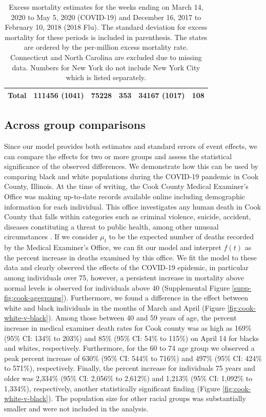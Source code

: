 \documentclass[11pt]{article}
\begin{document}
\begin{table}
\begin{tabular}{|l|lll|ll|}
 \hline
  Total & 111456 (1041) & 75228 & 353 & 34167 (1017) & 108 \\ 
  \hline
 \end{tabular}
 \caption{Excess mortality estimates for the weeks ending on March 14, 2020 to May 5, 2020 (COVID-19) and  December 16, 2017 to February 10, 2018 (2018 Flu). The standard deviation for excess mortality for these periods is included in parenthesis. The states are ordered by the per-million excess mortality rate. Connecticut and North Carolina are excluded due to missing data. Numbers for New York do not include New York City which is listed separately.}
 \label{tab:covid19-states}
 \normalsize
\end{table}
 
 

\subsection{Across group comparisons}
\label{subsec:group-comparison}
Since our model provides both estimates and standard errors of event effects, we can compare the effects for two or more groups and assess the statistical significance of the observed differences. We demonstrate how this can be used by comparing black and white populations during the COVID-19 pandemic in Cook County, Illinois. At the time of writing, the Cook County Medical Examiner's Office was making up-to-date records available online including demographic information for each individual. This office investigates any human death in Cook County that falls within categories such as criminal violence, suicide, accident, diseases constituting a threat to public health, among other unusual circumstances \cite{cookcovid19}. If we consider $\mu_t$ to be the expected number of deaths recorded by the Medical Examiner's Office, we can fit our model and interpret $f(t)$ as the percent increase in deaths examined by this office. We fit the model to these data and clearly observed the effects of the COVID-19 epidemic, in particular among individuals over 75,  however, a persistent increase in mortality above normal levels is observed for individuals above 40 (Supplemental Figure \ref{supp-fig:cook-agegroups}).  Furthermore, we found a difference in the effect  between white and black individuals in the months of March and April (Figure \ref{fig:cook-white-v-black}). Among those between 40 and 59 years of age, the percent increase in medical examiner death rates for Cook county was as high as 169\% (95\% CI: 134\% to 203\%) and 85\%  (95\% CI: 54\% to 115\%) on April 14 for blacks and whites, respectively. Furthermore, for the 60 to 74 age group we observed a peak percent increase of 630\% (95\% CI: 544\% to 716\%) and 497\% (95\% CI: 424\% to 571\%), respectively. Finally, the percent increase for individuals 75 years and older was 2,334\% (95\% CI: 2,056\% to 2,612\%) and 1,213\% (95\% CI: 1,092\% to 1,334\%), respectively, another statistically significant finding (Figure \ref{fig:cook-white-v-black}).  The population size for other racial groups was substantially smaller and were not included in the analysis.
\end{document}
